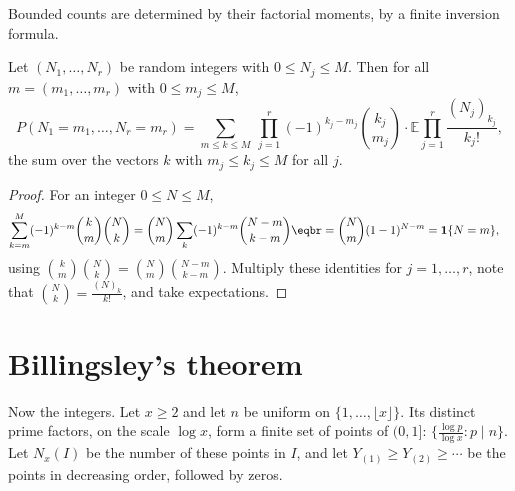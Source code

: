 Bounded counts are determined by their factorial moments, by a finite inversion formula.

\begin{lemma}\label{lem:inversion}
Let $(N_1,\dots,N_r)$ be random integers with $0\le N_j\le M$. Then for all $m=(m_1,\dots,m_r)$ with $0\le m_j\le M$,
\[
P(N_1=m_1,\dots,N_r=m_r)=\sum_{m\le k\le M}\ \prod_{j=1}^r(-1)^{k_j-m_j}\binom{k_j}{m_j}\cdot\mathbb E\prod_{j=1}^r\frac{(N_j)_{k_j}}{k_j!},
\]
the sum over the vectors $k$ with $m_j\le k_j\le M$ for all $j$.
\end{lemma}
\begin{proof}
For an integer $0\le N\le M$,
\[
\begin{aligned}\sum_{k=m}^M(-1)^{k-m}\binom km\binom Nk&=\binom Nm\sum_{k}(-1)^{k-m}\binom{N-m}{k-m}\eqbr=\binom Nm(1-1)^{N-m}=\mathbf 1\{N=m\},\end{aligned}
\]
using $\binom km\binom Nk=\binom Nm\binom{N-m}{k-m}$. Multiply these identities for $j=1,\dots,r$, note that
$\binom Nk=\frac{(N)_k}{k!}$, and take expectations.
\end{proof}

\section{Billingsley's theorem}

Now the integers. Let $x\ge2$ and let $n$ be uniform on $\{1,\dots,\lfloor x\rfloor\}$. Its distinct prime factors, on the scale $\log x$, form a finite set of points of $(0,1]$: $\{\frac{\log p}{\log x}:p\mid n\}$. Let $N_x(I)$ be the number of these points in $I$, and let $Y_{(1)}\ge Y_{(2)}\ge\cdots$
be the points in decreasing order, followed by zeros.

